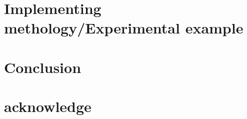 \documentclass{article}
\begin{document}
\section{Implementing methology/Experimental example}\label{sec.Example}

\section{Conclusion}\label{sec.Conclusion}

\section*{acknowledge}
\end{document}
